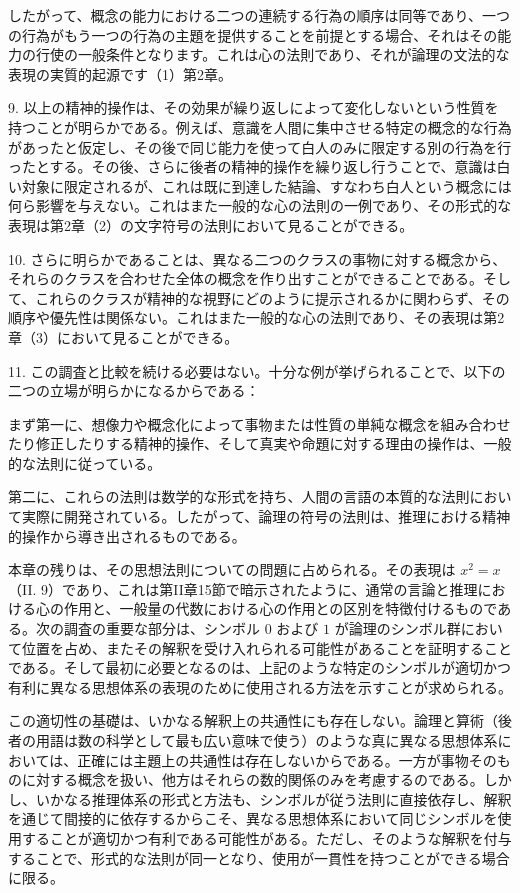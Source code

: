 \documentclass[a4paper,11pt,openany]{ltjsbook}
\begin{document}
したがって、概念の能力における二つの連続する行為の順序は同等であり、一つの行為がもう一つの行為の主題を提供することを前提とする場合、それはその能力の行使の一般条件となります。これは心の法則であり、それが論理の文法的な表現の実質的起源です（1）第2章。

9. 以上の精神的操作は、その効果が繰り返しによって変化しないという性質を持つことが明らかである。例えば、意識を人間に集中させる特定の概念的な行為があったと仮定し、その後で同じ能力を使って白人のみに限定する別の行為を行ったとする。その後、さらに後者の精神的操作を繰り返し行うことで、意識は白い対象に限定されるが、これは既に到達した結論、すなわち白人という概念には何ら影響を与えない。これはまた一般的な心の法則の一例であり、その形式的な表現は第2章（2）の文字符号の法則において見ることができる。

10. さらに明らかであることは、異なる二つのクラスの事物に対する概念から、それらのクラスを合わせた全体の概念を作り出すことができることである。そして、これらのクラスが精神的な視野にどのように提示されるかに関わらず、その順序や優先性は関係ない。これはまた一般的な心の法則であり、その表現は第2章（3）において見ることができる。

11. この調査と比較を続ける必要はない。十分な例が挙げられることで、以下の二つの立場が明らかになるからである：

まず第一に、想像力や概念化によって事物または性質の単純な概念を組み合わせたり修正したりする精神的操作、そして真実や命題に対する理由の操作は、一般的な法則に従っている。

第二に、これらの法則は数学的な形式を持ち、人間の言語の本質的な法則において実際に開発されている。したがって、論理の符号の法則は、推理における精神的操作から導き出されるものである。

本章の残りは、その思想法則についての問題に占められる。その表現は $x^2 = x$（II. 9）であり、これは第II章15節で暗示されたように、通常の言論と推理における心の作用と、一般量の代数における心の作用との区別を特徴付けるものである。次の調査の重要な部分は、シンボル $0$ および $1$ が論理のシンボル群において位置を占め、またその解釈を受け入れられる可能性があることを証明することである。そして最初に必要となるのは、上記のような特定のシンボルが適切かつ有利に異なる思想体系の表現のために使用される方法を示すことが求められる。

この適切性の基礎は、いかなる解釈上の共通性にも存在しない。論理と算術（後者の用語は数の科学として最も広い意味で使う）のような真に異なる思想体系においては、正確には主題上の共通性は存在しないからである。一方が事物そのものに対する概念を扱い、他方はそれらの数的関係のみを考慮するのである。しかし、いかなる推理体系の形式と方法も、シンボルが従う法則に直接依存し、解釈を通じて間接的に依存するからこそ、異なる思想体系において同じシンボルを使用することが適切かつ有利である可能性がある。ただし、そのような解釈を付与することで、形式的な法則が同一となり、使用が一貫性を持つことができる場合に限る。
\end{document}
